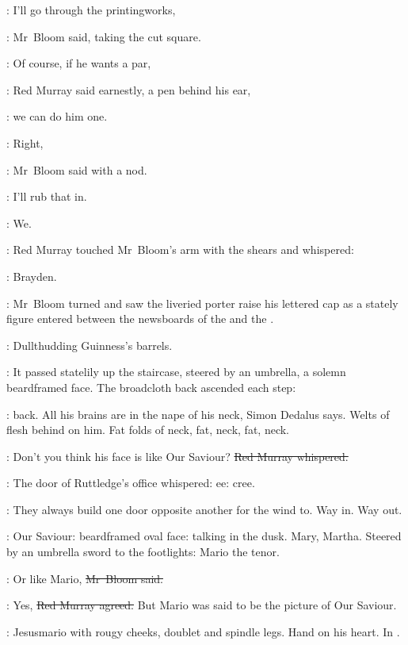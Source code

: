 \Bloom:
I'll go through the printingworks,

:
Mr~Bloom said,
taking the cut square.

\redmurray:
Of course, if he wants a par,

:
Red Murray said earnestly, a pen behind his ear,

\redmurray:
we can do him one.

\Bloom:
Right,

:
Mr~Bloom said with a nod.

\Bloom:
I'll rub that in.

\BloomInt:
We.



:
Red Murray touched Mr~Bloom's arm with the shears
and whispered:

\redmurray:
Brayden.

:
Mr~Bloom turned and saw the liveried porter raise his lettered cap
as a stately figure entered between the newsboards
of the 
and the .

:
Dullthudding Guinness's barrels.

:
It passed statelily up the staircase,
steered by an umbrella,
a solemn beardframed face.
The broadcloth back ascended each step:

\BloomInt:
back.
All his brains are in the nape of his neck, Simon Dedalus says.
Welts of flesh behind on him.
Fat folds of neck, fat, neck, fat, neck.

\redmurray:
Don't you think his face is like Our Saviour?
\sout{Red Murray whispered.}

:
The door of Ruttledge's office whispered:
ee:
cree.

\BloomInt:
They always build one door opposite another for the wind to.
Way in.
Way out.

\BloomInt:
Our Saviour:
beardframed oval face:
talking in the dusk.
Mary, Martha.
Steered by an umbrella sword to the footlights:
Mario the tenor.

\Bloom:
Or like Mario,
\sout{Mr~Bloom said.}

\redmurray:
Yes,
\sout{Red Murray agreed.}
But Mario was said to be the picture of Our Saviour.

\BloomInt:
Jesusmario with rougy cheeks, doublet and spindle legs.
Hand on his heart.
In .

%



